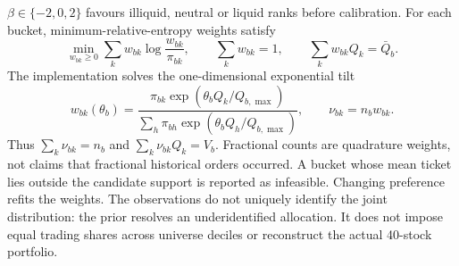 \documentclass[11pt,a4paper]{article}
\numberwithin{equation}{section}
\begin{document}
$\beta\in\{-2,0,2\}$ favours illiquid, neutral or liquid ranks before calibration.
For each bucket, minimum-relative-entropy weights satisfy
\begin{equation}\label{eq:jointfit}
 \min_{w_{bk}\geq0}\sum_k w_{bk}\log\frac{w_{bk}}{\pi_{bk}},
 \qquad \sum_k w_{bk}=1,\qquad \sum_k w_{bk}Q_k=\bar Q_b.
\end{equation}
The implementation solves the one-dimensional exponential tilt
\begin{equation}\label{eq:tilt}
 w_{bk}(\theta_b)=\frac{\pi_{bk}\exp(\theta_b Q_k/Q_{b,\max})}
 {\sum_h\pi_{bh}\exp(\theta_b Q_h/Q_{b,\max})},\qquad
 \nu_{bk}=n_bw_{bk}.
\end{equation}
Thus $\sum_k\nu_{bk}=n_b$ and $\sum_k\nu_{bk}Q_k=V_b$. Fractional counts are quadrature
weights, not claims that fractional historical orders occurred. A bucket whose mean ticket lies
outside the candidate support is reported as infeasible. Changing preference refits the weights.
The observations do not uniquely identify the joint distribution: the prior resolves an
underidentified allocation. It does not impose equal trading shares across universe deciles or
reconstruct the actual 40-stock portfolio.
\end{document}

